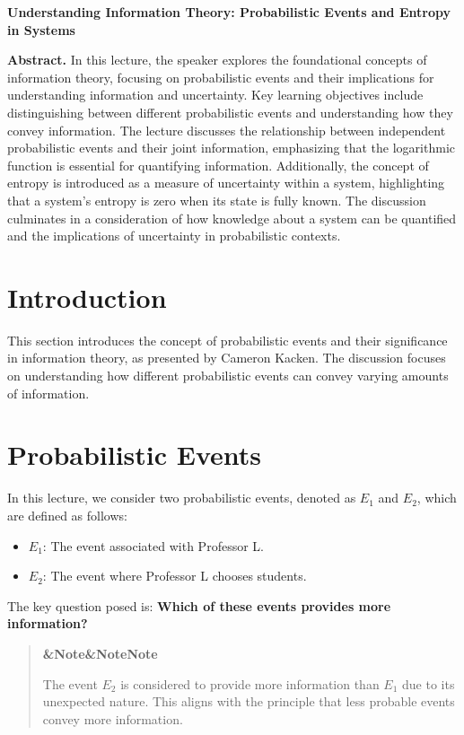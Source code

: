 \documentclass[a4paper]{article}
\newcommand{\boxheading}[1]{%
  \par\smallskip
  \noindent\textbf{\ifx&#1&Note\else#1\fi}\par
  \smallskip
}
\newenvironment{rembox}[1][]{%
  \begin{quote}\color{black!70}\boxheading{#1}\normalcolor
}{\end{quote}}
\begin{document}
\begin{center}
{\LARGE \textbf{Understanding Information Theory: Probabilistic Events and Entropy in Systems}}\\[1em]
\end{center}

\textbf{Abstract.} In this lecture, the speaker explores the foundational concepts of information theory, focusing on probabilistic events and their implications for understanding information and uncertainty. Key learning objectives include distinguishing between different probabilistic events and understanding how they convey information. The lecture discusses the relationship between independent probabilistic events and their joint information, emphasizing that the logarithmic function is essential for quantifying information. Additionally, the concept of entropy is introduced as a measure of uncertainty within a system, highlighting that a system's entropy is zero when its state is fully known. The discussion culminates in a consideration of how knowledge about a system can be quantified and the implications of uncertainty in probabilistic contexts.

\section{Introduction}
This section introduces the concept of probabilistic events and their significance in information theory, as presented by Cameron Kacken. The discussion focuses on understanding how different probabilistic events can convey varying amounts of information.

\section{Probabilistic Events}
In this lecture, we consider two probabilistic events, denoted as \(E_1\) and \(E_2\), which are defined as follows:

\begin{itemize}
    \item \(E_1\): The event associated with Professor L.
    \item \(E_2\): The event where Professor L chooses students.
\end{itemize}

The key question posed is: \textbf{Which of these events provides more information?}

\begin{rembox}[Note]
The event \(E_2\) is considered to provide more information than \(E_1\) due to its unexpected nature. This aligns with the principle that less probable events convey more information.
\end{rembox}
\end{document}
